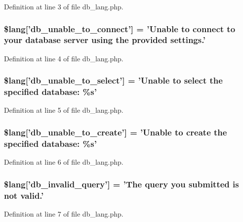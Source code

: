 Definition at line 3 of file db\-\_\-lang.\-php.

\subsubsection[{\$lang}]{\setlength{\rightskip}{0pt plus 5cm}\$lang['db\-\_\-unable\-\_\-to\-\_\-connect'] = 'Unable {\bf to} connect {\bf to} your database server using the provided settings.'}\label{db__lang_8php_aa5935b86c957eb15ac7d41cf84143d66}


Definition at line 4 of file db\-\_\-lang.\-php.

\subsubsection[{\$lang}]{\setlength{\rightskip}{0pt plus 5cm}\$lang['db\-\_\-unable\-\_\-to\-\_\-select'] = 'Unable {\bf to} select the specified database\-: \%{\bf s}'}\label{db__lang_8php_a3c93974df838c0e036690874108715ea}


Definition at line 5 of file db\-\_\-lang.\-php.

\subsubsection[{\$lang}]{\setlength{\rightskip}{0pt plus 5cm}\$lang['db\-\_\-unable\-\_\-to\-\_\-create'] = 'Unable {\bf to} create the specified database\-: \%{\bf s}'}\label{db__lang_8php_a4266e3b235feb16d9cf2e88afd1fedac}


Definition at line 6 of file db\-\_\-lang.\-php.

\subsubsection[{\$lang}]{\setlength{\rightskip}{0pt plus 5cm}\$lang['db\-\_\-invalid\-\_\-query'] = 'The query you submitted is {\bf not} valid.'}\label{db__lang_8php_a2cbf4ee929f45a29a0dcf21280bad485}


Definition at line 7 of file db\-\_\-lang.\-php.

